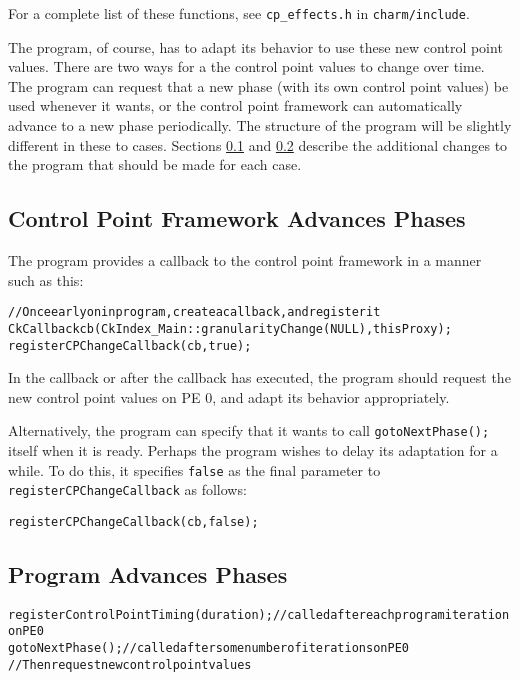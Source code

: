 For a complete list of these functions, see \texttt{cp\_effects.h} in \texttt{charm/include}.


The program, of course, has to adapt its behavior to use these new control point values. There are two ways for a the control point values to change over time. The program can request that a new phase (with its own control point values) be used whenever it wants, or the control point framework can automatically advance to a new phase periodically. The structure of the program will be slightly different in these to cases. Sections \ref{frameworkAdvancesPhases} and \ref{programAdvancesPhases} describe the additional changes to the program that should be made for each case.

\subsection{Control Point Framework Advances Phases}
\label{frameworkAdvancesPhases}

The program provides a callback to the control point framework in a manner such as this:

\begin{alltt} 
    // Once early on in program, create a callback, and register it 
    CkCallback cb(CkIndex_Main::granularityChange(NULL),thisProxy); 
    registerCPChangeCallback(cb, true);
\end{alltt} 

In the callback or after the callback has executed, the program should request the new control point values on PE 0, and adapt its behavior appropriately.

Alternatively, the program can specify that it wants to call \texttt{gotoNextPhase();} itself when it is ready. Perhaps the program wishes to delay its adaptation for a while. To do this, it specifies \texttt{false} as the final parameter to \texttt{registerCPChangeCallback} as follows:

\begin{alltt} 
   registerCPChangeCallback(cb, false);
\end{alltt} 


\subsection{Program Advances Phases}
\label{programAdvancesPhases}

\begin{alltt} 
     registerControlPointTiming(duration); // called after each program iteration on PE 0
     gotoNextPhase(); // called after some number of iterations on PE 0
    // Then request new control point values
\end{alltt} 



